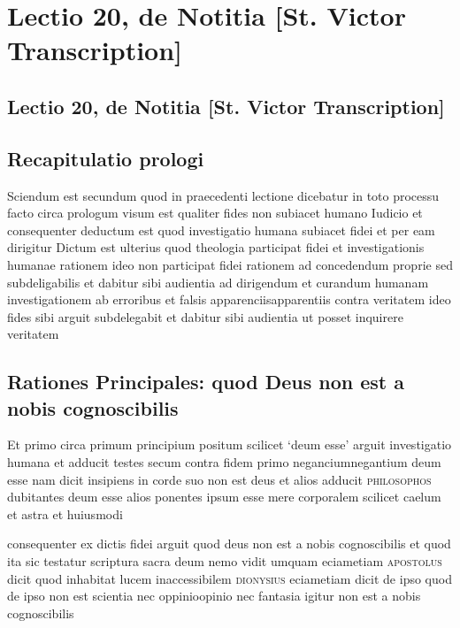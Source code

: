 \documentclass[twoside, openright]{report}
\newcommand{\name}[1]{\textsc{#1}}
\begin{document}
        \chapter*{Lectio 20, de Notitia [St. Victor Transcription]}
        
         
        \beginnumbering
         \section*{Lectio 20, de Notitia [St. Victor Transcription]} 
        \bigskip
         \section*{Recapitulatio prologi} 
        \pstart
        Sciendum est secundum quod in praecedenti lectione dicebatur in toto processu facto circa prologum visum est qualiter fides non subiacet humano Iudicio et consequenter deductum est quod investigatio humana subiacet fidei et per eam dirigitur Dictum est ulterius quod theologia participat fidei et investigationis humanae rationem ideo non participat fidei rationem ad concedendum proprie sed subdeligabilis et dabitur sibi audientia ad dirigendum et curandum humanam investigationem ab erroribus et falsis apparenciisapparentiis contra veritatem ideo fides sibi arguit subdelegabit  et dabitur sibi audientia ut posset inquirere veritatem
        \pend
      
        \bigskip
         \section*{Rationes Principales: quod Deus non est a nobis cognoscibilis} 
        \bigskip
         
        \pstart
        Et primo circa primum principium positum scilicet \enquote*{deum esse} arguit investigatio humana et adducit testes secum contra fidem primo neganciumnegantium deum esse nam dicit insipiens in corde suo non est deus et alios adducit \name{philosophos}\index[persons]{} dubitantes deum esse alios ponentes ipsum esse mere corporalem scilicet caelum et astra et huiusmodi
        \pend
     
        \pstart
        consequenter ex dictis fidei arguit quod deus non est a nobis cognoscibilis et quod ita sic testatur scriptura sacra deum nemo vidit umquam eciametiam \name{apostolus} dicit quod inhabitat lucem inaccessibilem \name{dionysius}\index[persons]{} eciametiam dicit de ipso quod de ipso non est scientia nec oppinioopinio nec fantasia igitur non est a nobis cognoscibilis
        \pend
      
\end{document}
